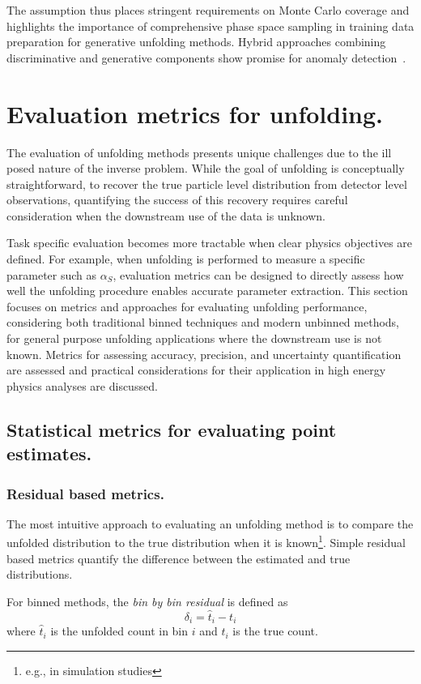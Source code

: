             The assumption thus places stringent requirements on Monte Carlo coverage and highlights the importance of comprehensive phase space sampling in training data preparation for generative unfolding methods.
            Hybrid approaches combining discriminative and generative components show promise for anomaly detection~\cite{DiMattia2019ADetection, Terjek2019AdversarialRegularization}.

\section{Evaluation metrics for unfolding.}
\sectionminitoc
    The evaluation of unfolding methods presents unique challenges due to the ill posed nature of the inverse problem.
    While the goal of unfolding is conceptually straightforward, to recover the true particle level distribution from detector level observations, quantifying the success of this recovery requires careful consideration when the downstream use of the data is unknown.
    
    Task specific evaluation becomes more tractable when clear physics objectives are defined.
    For example, when unfolding is performed to measure a specific parameter such as \(\alpha_S\), evaluation metrics can be designed to directly assess how well the unfolding procedure enables accurate parameter extraction.
    This section focuses on metrics and approaches for evaluating unfolding performance, considering both traditional binned techniques and modern unbinned methods, for general purpose unfolding applications where the downstream use is not known.
    Metrics for assessing accuracy, precision, and uncertainty quantification are assessed and practical considerations for their application in high energy physics analyses are discussed.

    
    \subsection{Statistical metrics for evaluating point estimates.}
        \subsubsection{Residual based metrics.}
            The most intuitive approach to evaluating an unfolding method is to compare the unfolded distribution to the true distribution when it is known\footnote{e.g., in simulation studies}.
            Simple residual based metrics quantify the difference between the estimated and true distributions.
            \begin{definition}[Residuals]
                For binned methods, the \emph{bin by bin residual} is defined as
            \begin{equation}
                \delta_i = \hat{t}_i - t_i
            \end{equation}
            where \(\hat{t}_i\) is the unfolded count in bin \(i\) and \(t_i\) is the true count.
            \end{definition}
            
